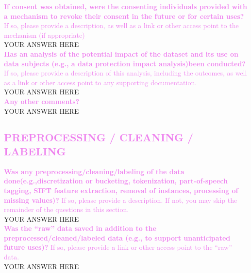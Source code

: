 \documentclass[letterpaper, 10 pt, conference]{ieeeconf}
\newcommand{\sectioncolor}{violet}
\begin{document}
    \textcolor{\sectioncolor}{\textbf{
    If consent was obtained, were the consenting individuals provided with a
    mechanism to revoke their consent in the future or for certain uses?
    }
     If so, please provide a description, as well as a link or other access
     point to the mechanism (if appropriate)
    } \\
    YOUR ANSWER HERE \\
    
    \textcolor{\sectioncolor}{\textbf{
    Has an analysis of the potential impact of the dataset and its use on data
    subjects (e.g., a data protection impact analysis)been conducted?
    }
    If so, please provide a description of this analysis, including the
    outcomes, as well as a link or other access point to any supporting
    documentation.
    } \\
    YOUR ANSWER HERE \\
    
    \textcolor{\sectioncolor}{\textbf{
    Any other comments?
    }} \\
    YOUR ANSWER HERE \\

\begin{mdframed}[linecolor=\sectioncolor]
\section*{\textcolor{\sectioncolor}{
    PREPROCESSING / CLEANING / LABELING
}}
\end{mdframed}

    \textcolor{\sectioncolor}{\textbf{
    Was any preprocessing/cleaning/labeling of the data
    done(e.g.,discretization or bucketing, tokenization, part-of-speech
    tagging, SIFT feature extraction, removal of instances, processing of
    missing values)?
    }
    If so, please provide a description. If not, you may skip the remainder of
    the questions in this section.
    } \\
    YOUR ANSWER HERE \\

    \textcolor{\sectioncolor}{\textbf{
    Was the “raw” data saved in addition to the preprocessed/cleaned/labeled
    data (e.g., to support unanticipated future uses)?
    }
    If so, please provide a link or other access point to the “raw” data.
    } \\
    YOUR ANSWER HERE \\
\end{document}
